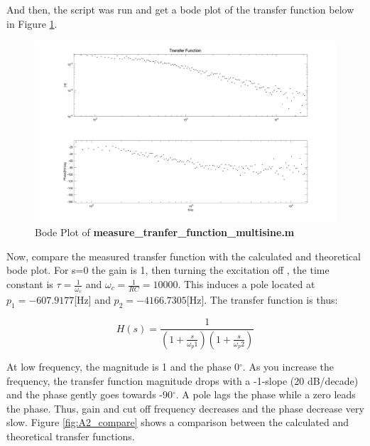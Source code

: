 \documentclass[
	a4paper,
	11pt,
]{article}
\begin{document}
And then, the script was run and get a bode plot of the transfer function below in Figure \ref{fig:A2_b}.

\begin{figure}[htb!]
    \centerline{\includegraphics[width=13cm]{figure/A2/transferfunction.jpg}}
    \caption{Bode Plot of \textbf{measure\_tranfer\_function\_multisine.m}}
    \label{fig:A2_b}
\end{figure}

Now, compare the measured transfer function with the calculated and theoretical bode plot. 
For s=0 the gain is 1, then turning the excitation off , the time constant is \(\tau = \frac{1}{\omega_c}\) and \(\omega_c = \frac{1}{RC} = 10000\). This induces a pole located at \(p_1 = -607.9177\)[Hz] and  \(p_2 = -4166.7305\)[Hz]. The transfer function is thus:

\begin{equation}
    H(s)= \frac{1}{(1+\frac{s}{\omega_p1})(1+\frac{s}{\omega_p2})}
\end{equation}


At low frequency, the magnitude is 1 and the phase 0\(^{\circ}\). As you increase the frequency, the transfer function magnitude drops with a -1-slope (20 dB/decade) and the phase gently goes towards -90\(^{\circ}\). A pole lags the phase while a zero leads the phase. Thus, gain and cut off frequency decreases and the phase decrease very slow. Figure \ref{fig:A2_compare} shows a comparison between the calculated and theoretical transfer functions.
\end{document}
